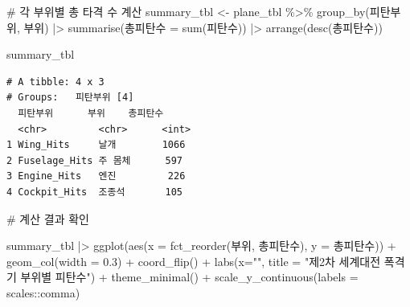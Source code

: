 \documentclass[
  letterpaper,
  chapter,a4paper,showtrims,openright,hidelinks]{oblivoir}
\newenvironment{Shaded}{\begin{snugshade}}{\end{snugshade}}
\newcommand{\AttributeTok}[1]{\textcolor[rgb]{0.40,0.45,0.13}{#1}}
\newcommand{\CommentTok}[1]{\textcolor[rgb]{0.37,0.37,0.37}{#1}}
\newcommand{\FloatTok}[1]{\textcolor[rgb]{0.68,0.00,0.00}{#1}}
\newcommand{\FunctionTok}[1]{\textcolor[rgb]{0.28,0.35,0.67}{#1}}
\newcommand{\NormalTok}[1]{\textcolor[rgb]{0.00,0.23,0.31}{#1}}
\newcommand{\OtherTok}[1]{\textcolor[rgb]{0.00,0.23,0.31}{#1}}
\newcommand{\SpecialCharTok}[1]{\textcolor[rgb]{0.37,0.37,0.37}{#1}}
\newcommand{\StringTok}[1]{\textcolor[rgb]{0.13,0.47,0.30}{#1}}
\begin{document}
\begin{Shaded}
\begin{Highlighting}[]
\CommentTok{\# 각 부위별 총 타격 수 계산}
\NormalTok{summary\_tbl }\OtherTok{\textless{}{-}}\NormalTok{ plane\_tbl }\SpecialCharTok{\%\textgreater{}\%} 
  \FunctionTok{group\_by}\NormalTok{(피탄부위, 부위) }\SpecialCharTok{|\textgreater{}} 
  \FunctionTok{summarise}\NormalTok{(총피탄수 }\OtherTok{=} \FunctionTok{sum}\NormalTok{(피탄수)) }\SpecialCharTok{|\textgreater{}} 
  \FunctionTok{arrange}\NormalTok{(}\FunctionTok{desc}\NormalTok{(총피탄수))}

\NormalTok{summary\_tbl}
\end{Highlighting}
\end{Shaded}

\begin{verbatim}
# A tibble: 4 x 3
# Groups:   피탄부위 [4]
  피탄부위      부위    총피탄수
  <chr>         <chr>      <int>
1 Wing_Hits     날개        1066
2 Fuselage_Hits 주 몸체      597
3 Engine_Hits   엔진         226
4 Cockpit_Hits  조종석       105
\end{verbatim}

\begin{Shaded}
\begin{Highlighting}[]
\CommentTok{\# 계산 결과 확인}

\NormalTok{summary\_tbl }\SpecialCharTok{|\textgreater{}} 
  \FunctionTok{ggplot}\NormalTok{(}\FunctionTok{aes}\NormalTok{(}\AttributeTok{x =} \FunctionTok{fct\_reorder}\NormalTok{(부위, 총피탄수), }\AttributeTok{y =}\NormalTok{ 총피탄수)) }\SpecialCharTok{+}
    \FunctionTok{geom\_col}\NormalTok{(}\AttributeTok{width =} \FloatTok{0.3}\NormalTok{) }\SpecialCharTok{+}
    \FunctionTok{coord\_flip}\NormalTok{() }\SpecialCharTok{+}
    \FunctionTok{labs}\NormalTok{(}\AttributeTok{x=}\StringTok{""}\NormalTok{,}
         \AttributeTok{title =} \StringTok{"제2차 세계대전 폭격기 부위별 피탄수"}\NormalTok{) }\SpecialCharTok{+}
    \FunctionTok{theme\_minimal}\NormalTok{() }\SpecialCharTok{+}
    \FunctionTok{scale\_y\_continuous}\NormalTok{(}\AttributeTok{labels =}\NormalTok{ scales}\SpecialCharTok{::}\NormalTok{comma)}
\end{Highlighting}
\end{Shaded}
\end{document}
